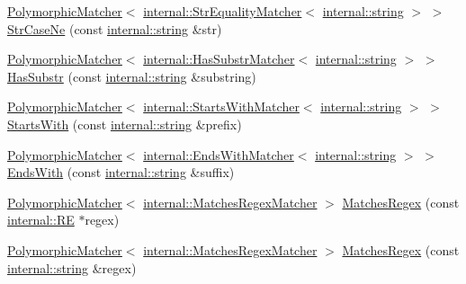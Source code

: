 \begin{DoxyCompactItemize}
\item 
\hyperlink{classtesting_1_1PolymorphicMatcher}{Polymorphic\+Matcher}$<$ \hyperlink{classtesting_1_1internal_1_1StrEqualityMatcher}{internal\+::\+Str\+Equality\+Matcher}$<$ \hyperlink{namespacetesting_1_1internal_a8e8ff5b11e64078831112677156cb111}{internal\+::string} $>$ $>$ \hyperlink{namespacetesting_a9596fd67bdd5df195bc54382f91a1906}{Str\+Case\+Ne} (const \hyperlink{namespacetesting_1_1internal_a8e8ff5b11e64078831112677156cb111}{internal\+::string} \&str)
\item 
\hyperlink{classtesting_1_1PolymorphicMatcher}{Polymorphic\+Matcher}$<$ \hyperlink{classtesting_1_1internal_1_1HasSubstrMatcher}{internal\+::\+Has\+Substr\+Matcher}$<$ \hyperlink{namespacetesting_1_1internal_a8e8ff5b11e64078831112677156cb111}{internal\+::string} $>$ $>$ \hyperlink{namespacetesting_a7d27682e38d57eea81ba145a2772e1c7}{Has\+Substr} (const \hyperlink{namespacetesting_1_1internal_a8e8ff5b11e64078831112677156cb111}{internal\+::string} \&substring)
\item 
\hyperlink{classtesting_1_1PolymorphicMatcher}{Polymorphic\+Matcher}$<$ \hyperlink{classtesting_1_1internal_1_1StartsWithMatcher}{internal\+::\+Starts\+With\+Matcher}$<$ \hyperlink{namespacetesting_1_1internal_a8e8ff5b11e64078831112677156cb111}{internal\+::string} $>$ $>$ \hyperlink{namespacetesting_ae0502232432b1fe8361d296c6de6beda}{Starts\+With} (const \hyperlink{namespacetesting_1_1internal_a8e8ff5b11e64078831112677156cb111}{internal\+::string} \&prefix)
\item 
\hyperlink{classtesting_1_1PolymorphicMatcher}{Polymorphic\+Matcher}$<$ \hyperlink{classtesting_1_1internal_1_1EndsWithMatcher}{internal\+::\+Ends\+With\+Matcher}$<$ \hyperlink{namespacetesting_1_1internal_a8e8ff5b11e64078831112677156cb111}{internal\+::string} $>$ $>$ \hyperlink{namespacetesting_aec11c4e418a835ca2c0c3cbdb29b28ba}{Ends\+With} (const \hyperlink{namespacetesting_1_1internal_a8e8ff5b11e64078831112677156cb111}{internal\+::string} \&suffix)
\item 
\hyperlink{classtesting_1_1PolymorphicMatcher}{Polymorphic\+Matcher}$<$ \hyperlink{classtesting_1_1internal_1_1MatchesRegexMatcher}{internal\+::\+Matches\+Regex\+Matcher} $>$ \hyperlink{namespacetesting_a4dac232f315edc259b62ce88e413b107}{Matches\+Regex} (const \hyperlink{classtesting_1_1internal_1_1RE}{internal\+::\+RE} $\ast$regex)
\item 
\hyperlink{classtesting_1_1PolymorphicMatcher}{Polymorphic\+Matcher}$<$ \hyperlink{classtesting_1_1internal_1_1MatchesRegexMatcher}{internal\+::\+Matches\+Regex\+Matcher} $>$ \hyperlink{namespacetesting_afea6e0eaf0ae69b409fc1c0285df6c8c}{Matches\+Regex} (const \hyperlink{namespacetesting_1_1internal_a8e8ff5b11e64078831112677156cb111}{internal\+::string} \&regex)

\end{DoxyCompactItemize}

